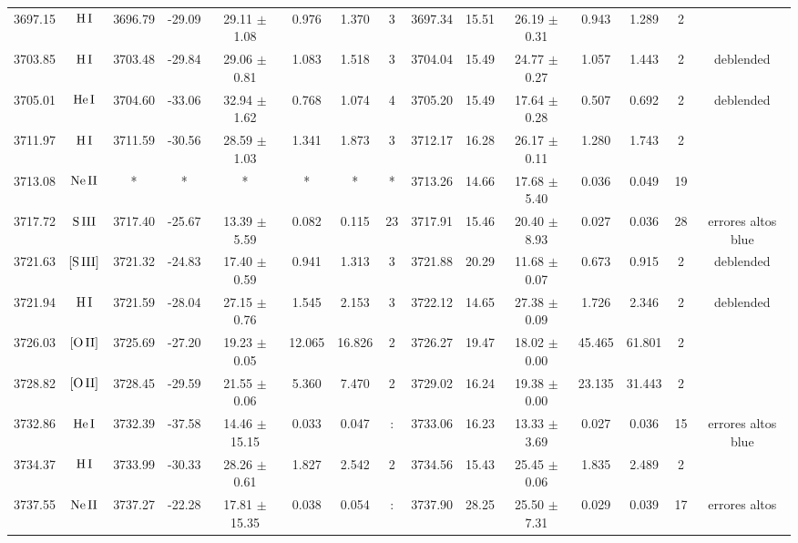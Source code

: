 \documentclass{article}
\begin{document}
\begin{table*}
\begin{adjustbox}{width=\textwidth}
\begin{tabular}{ccccccccccccccc}
3697.15 & $\mbox{H}\thinspace \mbox{I}$ & 3696.79 & -29.09 & 29.11 $\pm$ 1.08 & 0.976 & 1.370 & 3 & 3697.34 & 15.51 & 26.19 $\pm$ 0.31 & 0.943 & 1.289 & 2 &  \\
3703.85 & $\mbox{H}\thinspace \mbox{I}$ & 3703.48 & -29.84 & 29.06 $\pm$ 0.81 & 1.083 & 1.518 & 3 & 3704.04 & 15.49 & 24.77 $\pm$ 0.27 & 1.057 & 1.443 & 2 &  deblended \\
3705.01 & $\mbox{He}\thinspace \mbox{I}$ & 3704.60 & -33.06 & 32.94 $\pm$ 1.62 & 0.768 & 1.074 & 4 & 3705.20 & 15.49 & 17.64 $\pm$ 0.28 & 0.507 & 0.692 & 2 &  deblended \\
3711.97 & $\mbox{H}\thinspace \mbox{I}$ & 3711.59 & -30.56 & 28.59 $\pm$ 1.03 & 1.341 & 1.873 & 3 & 3712.17 & 16.28 & 26.17 $\pm$ 0.11 & 1.280 & 1.743 & 2 &  \\
3713.08 & $\mbox{Ne}\thinspace \mbox{II}$ & * & * & * & * & * & * & 3713.26 & 14.66 & 17.68 $\pm$ 5.40 & 0.036 & 0.049 & 19 &  \\
3717.72 & $\mbox{S}\thinspace \mbox{III}$ & 3717.40 & -25.67 & 13.39 $\pm$ 5.59 & 0.082 & 0.115 & 23 & 3717.91 & 15.46 & 20.40 $\pm$ 8.93 & 0.027 & 0.036 & 28 &  errores altos blue \\
3721.63 & $\mbox{[S}\thinspace \mbox{III]}$ & 3721.32 & -24.83 & 17.40 $\pm$ 0.59 & 0.941 & 1.313 & 3 & 3721.88 & 20.29 & 11.68 $\pm$ 0.07 & 0.673 & 0.915 & 2 &  deblended \\
3721.94 & $\mbox{H}\thinspace \mbox{I}$ & 3721.59 & -28.04 & 27.15 $\pm$ 0.76 & 1.545 & 2.153 & 3 & 3722.12 & 14.65 & 27.38 $\pm$ 0.09 & 1.726 & 2.346 & 2 &  deblended \\
3726.03 & $\mbox{[O}\thinspace \mbox{II]}$ & 3725.69 & -27.20 & 19.23 $\pm$ 0.05 & 12.065 & 16.826 & 2 & 3726.27 & 19.47 & 18.02 $\pm$ 0.00 & 45.465 & 61.801 & 2 &  \\
3728.82 & $\mbox{[O}\thinspace \mbox{II]}$ & 3728.45 & -29.59 & 21.55 $\pm$ 0.06 & 5.360 & 7.470 & 2 & 3729.02 & 16.24 & 19.38 $\pm$ 0.00 & 23.135 & 31.443 & 2 &  \\
3732.86 & $\mbox{He}\thinspace \mbox{I}$ & 3732.39 & -37.58 & 14.46 $\pm$ 15.15 & 0.033 & 0.047 & : & 3733.06 & 16.23 & 13.33 $\pm$ 3.69 & 0.027 & 0.036 & 15 &  errores altos blue \\
3734.37 & $\mbox{H}\thinspace \mbox{I}$ & 3733.99 & -30.33 & 28.26 $\pm$ 0.61 & 1.827 & 2.542 & 2 & 3734.56 & 15.43 & 25.45 $\pm$ 0.06 & 1.835 & 2.489 & 2 &  \\
3737.55 & $\mbox{Ne}\thinspace \mbox{II}$ & 3737.27 & -22.28 & 17.81 $\pm$ 15.35 & 0.038 & 0.054 & : & 3737.90 & 28.25 & 25.50 $\pm$ 7.31 & 0.029 & 0.039 & 17 &  errores altos \\

\end{tabular}
\end{adjustbox}
\end{table*}
\end{document}
